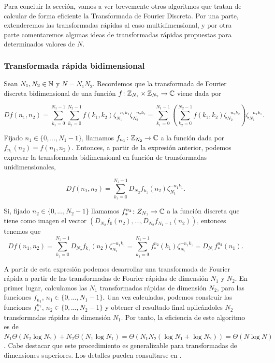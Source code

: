 \documentclass{article}
\begin{document}
Para concluir la sección, vamos a ver brevemente otros algoritmos que tratan de calcular de forma eficiente la Transformada de Fourier Discreta. Por una parte, extenderemos las transformadas rápidas al caso multidimensional, y por otra parte comentaremos algunas ideas de transformadas rápidas propuestas para determinados valores de $N$.

\subsubsection{Transformada rápida bidimensional}

Sean $N_1, N_2 \in \mathbb{N}$ y $N = N_1N_2$. Recordemos que la transformada de Fourier discreta bidimensional de una función $f\colon \mathbb{Z}_{N_1} \times \mathbb{Z}_{N_2} \to \mathbb{C}$ viene dada por

\[ Df(n_1,n_2) = \sum_{k_1=0}^{N_1-1}\sum_{k_2=0}^{N_2-1}f(k_1,k_2)\zeta_{N_1}^{-n_1k_1}\zeta_{N_2}^{-n_2k_2} = \sum_{k_1=0}^{N_1-1}\left(\sum_{k_2=0}^{N_2-1}f(k_1,k_2)\zeta_{N_2}^{-n_2k_2}\right)\zeta_{N_1}^{-n_1k_1}. \]

Fijado $n_1 \in \{0,\dots,N_1-1\}$, llamamos $f_{n_1}\colon \mathbb{Z}_{N_2} \to \mathbb{C}$ a la función dada por $f_{n_1}(n_2) = f(n_1,n_2)$. Entonces, a partir de la expresión anterior, podemos expresar la transformada bidimensional en función de transformadas unidimensionales,

\[ Df(n_1,n_2) = \sum_{k_1=0}^{N_1-1}D_{N_2}f_{k_1}(n_2)\zeta_{N_1}^{-n_1k_1}. \]

Si, fijado $n_2 \in \{0,\dots,N_2-1\}$ llamamos $f^{n_2}_{*}\colon Z_{N_1} \to \mathbb{C}$ a la función discreta que tiene como imagen el vector $(D_{N_2}f_{0}(n_2),\dots,D_{N_2}f_{N_1-1}(n_2))$, entonces tenemos que
\[ Df(n_1,n_2) = \sum_{k_1=0}^{N_1-1}D_{N_2}f_{k_1}(n_2)\zeta_{N_1}^{-n_1k_1} = \sum_{k_1=0}^{N_1-1}f^{n_2}_{*}(k_1)\zeta_{N_1}^{-n_1k_1} = D_{N_1}f_{*}^{n_2}(n_1). \]

A partir de esta expresión podemos desarrollar una transformada de Fourier rápida a partir de las transformadas de Fourier rápidas de dimensión $N_1$ y $N_2$. En primer lugar, calculamos las $N_1$ transformadas rápidas de dimensión $N_2$, para las funciones $f_{n_1}$, $n_1 \in \{0,\dots,N_1-1\}$. Una vez calculadas, podemos construir las funciones $f^{n_2}_{*}$, $n_2 \in \{0,\dots,N_2-1\}$ y obtener el resultado final aplicándoles $N_2$ transformadas rápidas de dimensión $N_1$. Por tanto, la eficiencia de este algoritmo es de $N_1\Theta(N_2\log N_2) + N_2\Theta(N_1\log N_1) = \Theta(N_1N_2(\log N_1 + \log N_2)) = \Theta(N \log N)$. Cabe destacar que este procedimiento es generalizable para transformadas de dimensiones superiores. Los detalles pueden consultarse en \cite{cormen2009introduction}.
\end{document}
